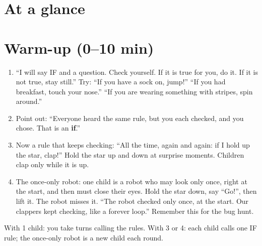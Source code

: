 \section{At a glance}
\begin{timeplan}
\end{timeplan}

\section{Warm-up (0--10 min)}
\begin{unplugged}
\begin{enumerate}[leftmargin=1.4em,itemsep=1pt]
  \item \enquote{I will say IF and a question. Check yourself. If it is true for you, do it. If it is not true, stay still.} Try: \enquote{If you have a sock on, jump!} \enquote{If you had breakfast, touch your nose.} \enquote{If you are wearing something with stripes, spin around.}
  \item Point out: \enquote{Everyone heard the same rule, but you each checked, and you chose. That is an \textbf{if}.}
  \item Now a rule that keeps checking: \enquote{All the time, again and again: if I hold up the star, clap!} Hold the star up and down at surprise moments. Children clap only while it is up.
  \item The once-only robot: one child is a robot who may look only once, right at the start, and then must close their eyes. Hold the star down, say \enquote{Go!}, then lift it. The robot misses it. \enquote{The robot checked only once, at the start. Our clappers kept checking, like a forever loop.} Remember this for the bug hunt.
\end{enumerate}
With 1 child: you take turns calling the rules. With 3 or 4: each child calls one IF rule; the once-only robot is a new child each round.
\end{unplugged}

